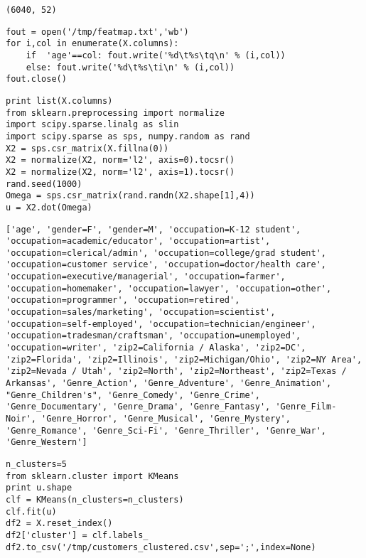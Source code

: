 \documentclass[12pt,fleqn]{article}\usepackage{../common}
\begin{document}
\begin{verbatim}
(6040, 52)
\end{verbatim}
\begin{verbatim}
fout = open('/tmp/featmap.txt','wb')
for i,col in enumerate(X.columns):
    if  'age'==col: fout.write('%d\t%s\tq\n' % (i,col))
    else: fout.write('%d\t%s\ti\n' % (i,col))    
fout.close()
\end{verbatim}

\begin{verbatim}
print list(X.columns)
from sklearn.preprocessing import normalize
import scipy.sparse.linalg as slin
import scipy.sparse as sps, numpy.random as rand
X2 = sps.csr_matrix(X.fillna(0))
X2 = normalize(X2, norm='l2', axis=0).tocsr()
X2 = normalize(X2, norm='l2', axis=1).tocsr()    
rand.seed(1000)
Omega = sps.csr_matrix(rand.randn(X2.shape[1],4))
u = X2.dot(Omega)
\end{verbatim}

\begin{verbatim}
['age', 'gender=F', 'gender=M', 'occupation=K-12 student', 'occupation=academic/educator', 'occupation=artist', 'occupation=clerical/admin', 'occupation=college/grad student', 'occupation=customer service', 'occupation=doctor/health care', 'occupation=executive/managerial', 'occupation=farmer', 'occupation=homemaker', 'occupation=lawyer', 'occupation=other', 'occupation=programmer', 'occupation=retired', 'occupation=sales/marketing', 'occupation=scientist', 'occupation=self-employed', 'occupation=technician/engineer', 'occupation=tradesman/craftsman', 'occupation=unemployed', 'occupation=writer', 'zip2=California / Alaska', 'zip2=DC', 'zip2=Florida', 'zip2=Illinois', 'zip2=Michigan/Ohio', 'zip2=NY Area', 'zip2=Nevada / Utah', 'zip2=North', 'zip2=Northeast', 'zip2=Texas / Arkansas', 'Genre_Action', 'Genre_Adventure', 'Genre_Animation', "Genre_Children's", 'Genre_Comedy', 'Genre_Crime', 'Genre_Documentary', 'Genre_Drama', 'Genre_Fantasy', 'Genre_Film-Noir', 'Genre_Horror', 'Genre_Musical', 'Genre_Mystery', 'Genre_Romance', 'Genre_Sci-Fi', 'Genre_Thriller', 'Genre_War', 'Genre_Western']
\end{verbatim}

\begin{verbatim}
n_clusters=5
from sklearn.cluster import KMeans
print u.shape
clf = KMeans(n_clusters=n_clusters)
clf.fit(u)    
df2 = X.reset_index()
df2['cluster'] = clf.labels_
df2.to_csv('/tmp/customers_clustered.csv',sep=';',index=None)
\end{verbatim}
\end{document}
